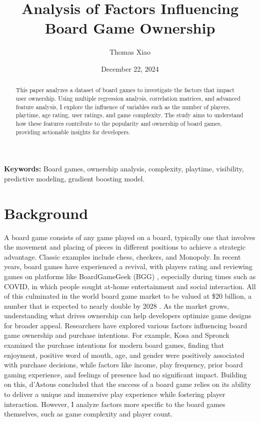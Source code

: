 \documentclass{article}
\title{Analysis of Factors Influencing Board Game Ownership}
\author{Thomas Xiao}
\date{December 22, 2024}
\begin{document}
\maketitle

\begin{abstract}
This paper analyzes a dataset of board games to investigate the factors that impact user ownership. Using multiple regression analysis, correlation matrices, and advanced feature analysis, I explore the influence of variables such as the number of players, playtime, age rating, user ratings, and game complexity. The study aims to understand how these features contribute to the popularity and ownership of board games, providing actionable insights for developers.
\end{abstract}

\textbf{Keywords:} Board games, ownership analysis, complexity, playtime, visibility, predictive modeling, gradient boosting model.


\section{Background}
A board game consists of any game played on a board, typically one that involves the movement and placing of pieces in different positions to achieve a strategic advantage. Classic examples include chess, checkers, and Monopoly. In recent years, board games have experienced a revival, with players rating and reviewing games on platforms like BoardGameGeek (BGG) \cite{pitt_board_games}, especially during times such as COVID, in which people sought at-home entertainment and social interaction. All of this culminated in the world board game market to be valued at \$20 billion, a number that is expected to nearly double by 2028 \cite{oakpark_boardgames}. As the market grows, understanding what drives ownership can help developers optimize game designs for broader appeal. Researchers have explored various factors influencing board game ownership and purchase intentions. For example, Kosa and Spronck \cite{modern_board_games} examined the purchase intentions for modern board games, finding that enjoyment, positive word of mouth, age, and gender were positively associated with purchase decisions, while factors like income, play frequency, prior board gaming experience, and feelings of presence had no significant impact. Building on this, d'Astous \cite{consumer_appreciation_board_game} concluded that the success of a board game relies on its ability to deliver a unique and immersive play experience while fostering player interaction. However, I analyze factors more specific to the board games themselves, such as game complexity and player count.
\end{document}
